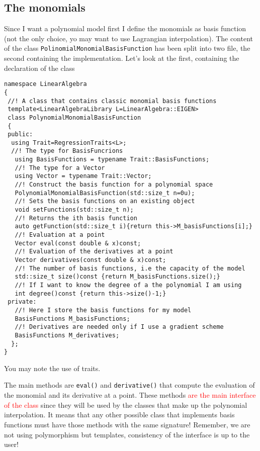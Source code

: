 \documentclass{article}
\newcommand{\li}{\lstinline}
\begin{document}
\subsection{The monomials}
Since I want a polynomial model first I define the monomials as basis function (not the only choice, yo may want to use Lagrangian interpolation).
The content of the class \li!PolinomialMonomialBasisFunction! has been split into two file, the second containing the implementation. Let's look at the first, containing the declaration of the class

\begin{lstlisting}[title={PolynomialBasis.hpp}]
namespace LinearAlgebra
{
 //! A class that contains classic monomial basis functions
 template<LinearAlgebraLibrary L=LinearAlgebra::EIGEN>
 class PolynomialMonomialBasisFunction
 {
 public:
  using Trait=RegressionTraits<L>;
  //! The type for BasisFuncrions
   using BasisFunctions = typename Trait::BasisFunctions;
   //! The type for a Vector
   using Vector = typename Trait::Vector;
   //! Construct the basis function for a polynomial space
   PolynomialMonomialBasisFunction(std::size_t n=0u);
   //! Sets the basis functions on an existing object
   void setFunctions(std::size_t n);
   //! Returns the ith basis function
   auto getFunction(std::size_t i){return this->M_basisFunctions[i];}
   //! Evaluation at a point
   Vector eval(const double & x)const;
   //! Evaluation of the derivatives at a point
   Vector derivatives(const double & x)const;
   //! The number of basis functions, i.e the capacity of the model
   std::size_t size()const {return M_basisFunctions.size();}
   //! If I want to know the degree of a the polynomial I am using
   int degree()const {return this->size()-1;}
 private:
   //! Here I store the basis functions for my model
   BasisFunctions M_basisFunctions;
   //! Derivatives are needed only if I use a gradient scheme
   BasisFunctions M_derivatives;
  };
}
\end{lstlisting}
You may note the use of traits.

The main methods are \li!eval()! and \li!derivative()! that compute
the evaluation of the monomial and its derivative at a point. These
methods \textcolor{red}{are the main interface of the class} since
they will be used by the classes that make up the polynomial
interpolation. It means that any other possible class that implements
basis functions must have those methods with the same signature!
Remember, we are not using polymorphism but templates, consistency of
the interface is up to the user!
\end{document}
